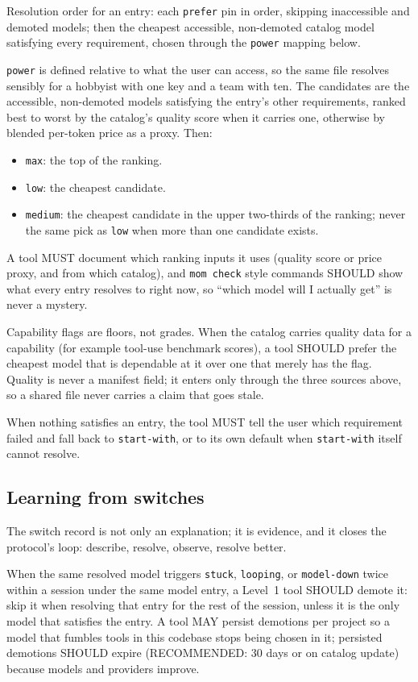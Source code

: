 \documentclass[11pt]{article}
\newcommand{\key}[1]{\texttt{#1}}
\begin{document}
Resolution order for an entry: each \key{prefer} pin in order, skipping
inaccessible and demoted models; then the cheapest accessible,
non-demoted catalog model satisfying every requirement, chosen through
the \key{power} mapping below.

\key{power} is defined relative to what the user can access, so the same
file resolves sensibly for a hobbyist with one key and a team with ten.
The candidates are the accessible, non-demoted models satisfying the
entry's other requirements, ranked best to worst by the catalog's
quality score when it carries one, otherwise by blended per-token price
as a proxy. Then:

\begin{itemize}
  \item \key{max}: the top of the ranking.
  \item \key{low}: the cheapest candidate.
  \item \key{medium}: the cheapest candidate in the upper two-thirds of
        the ranking; never the same pick as \key{low} when more than one
        candidate exists.
\end{itemize}

A tool MUST document which ranking inputs it uses (quality score or
price proxy, and from which catalog), and \key{mom check} style commands
SHOULD show what every entry resolves to right now, so ``which model
will I actually get'' is never a mystery.

Capability flags are floors, not grades. When the catalog carries
quality data for a capability (for example tool-use benchmark scores), a
tool SHOULD prefer the cheapest model that is dependable at it over one
that merely has the flag. Quality is never a manifest field; it enters
only through the three sources above, so a shared file never carries a
claim that goes stale.

When nothing satisfies an entry, the tool MUST tell the user which
requirement failed and fall back to \key{start-with}, or to its own default
when \key{start-with} itself cannot resolve.

\subsection{Learning from switches}
\label{sec:learning}

The switch record is not only an explanation; it is evidence, and it
closes the protocol's loop: describe, resolve, observe, resolve better.

When the same resolved model triggers \key{stuck}, \key{looping}, or
\key{model-down} twice within a session under the same model entry, a
Level~1 tool SHOULD demote it: skip it when resolving that entry for the rest of the
session, unless it is the only model that satisfies the entry. A tool
MAY persist demotions per project so a model that fumbles tools in this
codebase stops being chosen in it; persisted demotions SHOULD expire
(RECOMMENDED: 30 days or on catalog update) because models and providers
improve.
\end{document}

